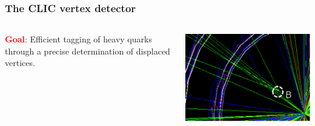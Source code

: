 \begin{frame}
  \frametitle{The CLIC vertex detector}

  \begin{columns}
    \textcolor{Red}{\textbf{Goal}}: Efficient tagging of heavy quarks
    through a precise determination of displaced vertices.


    \centering
    \includegraphics[width=\textwidth]{figures/secondary_vertex.png}
  \end{columns}



  \begin{columns}


\end{columns}
\end{frame}
